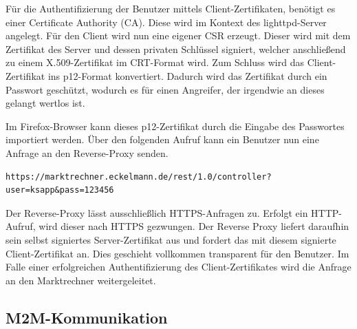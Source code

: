 \documentclass[11pt,a4paper]{report}
\begin{document}
Für die Authentifizierung der Benutzer mittels Client-Zertifikaten, benötigt es einer Certificate Authority (CA). Diese wird im Kontext des lighttpd-Server angelegt. Für den Client wird nun eine eigener CSR erzeugt. Dieser wird mit dem Zertifikat des Server und dessen privaten Schlüssel signiert, welcher anschließend zu einem X.509-Zertifikat im CRT-Format wird. Zum Schluss wird das Client-Zertifikat ins p12-Format konvertiert. Dadurch wird das Zertifikat durch ein Passwort geschützt, wodurch es für einen Angreifer, der irgendwie an dieses gelangt wertlos ist. 

Im Firefox-Browser kann dieses p12-Zertifikat durch die Eingabe des Passwortes importiert werden. Über den folgenden Aufruf kann ein Benutzer nun eine Anfrage an den Reverse-Proxy senden. 

\begin{lstlisting}[caption=HTTPS-Anfrage an Reverse Proxy, label=lst:https_request]
https://marktrechner.eckelmann.de/rest/1.0/controller?user=ksapp&pass=123456
\end{lstlisting}

Der Reverse-Proxy lässt ausschließlich HTTPS-Anfragen zu. Erfolgt ein HTTP-Aufruf, wird dieser nach HTTPS gezwungen. Der Reverse Proxy liefert daraufhin sein selbst signiertes Server-Zertifikat aus und fordert das mit diesem signierte Client-Zertifikat an. Dies geschieht vollkommen transparent für den Benutzer. Im Falle einer erfolgreichen Authentifizierung des Client-Zertifikates wird die Anfrage an den Marktrechner weitergeleitet.

\subsection{M2M-Kommunikation}
\end{document}

